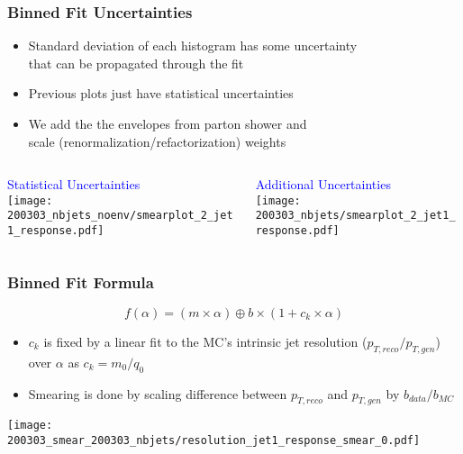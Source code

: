 \documentclass{beamer}
\begin{document}
\begin{frame}
  \frametitle{Binned Fit Uncertainties}

  \begin{itemize}
  \item Standard deviation of each histogram has some uncertainty \\
    that can be propagated through the fit
  \item Previous plots just have statistical uncertainties
  \item We add the the envelopes from parton shower and \\
    scale (renormalization/refactorization) weights
  \end{itemize}

  \begin{columns}
    \begin{column}{0.5\linewidth}
      \centering
      \textcolor{blue}{Statistical Uncertainties} \\
      \texttt{[image: 200303\_nbjets\_noenv/smearplot\_2\_jet1\_response.pdf]}
    \end{column}
    \begin{column}{0.5\linewidth}
      \centering
      \textcolor{blue}{Additional Uncertainties} \\
      \texttt{[image: 200303\_nbjets/smearplot\_2\_jet1\_response.pdf]}
    \end{column}
  \end{columns}

\end{frame}


\begin{frame}
  \frametitle{Binned Fit Formula}

  \[
  f(\alpha) = (m \times \alpha) \oplus b \times (1 + c_k \times \alpha)
  \]

  \begin{itemize}
  \item $c_k$ is fixed by a linear fit to the MC's intrinsic jet resolution ($p_{T, reco}/p_{T, gen}$) over $\alpha$ as $c_k = m_0/q_0$
  \item Smearing is done by scaling difference between $p_{T,reco}$ and $p_{T,gen}$ by $b_{data}/b_{MC}$
  \end{itemize}

  \centering
  \texttt{[image: 200303\_smear\_200303\_nbjets/resolution\_jet1\_response\_smear\_0.pdf]}

\end{frame}
\end{document}
